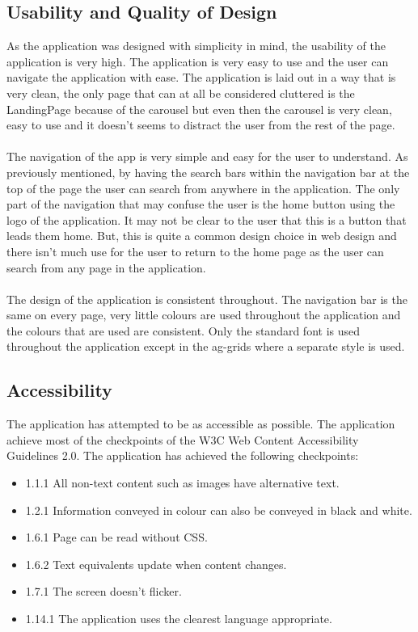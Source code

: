 \documentclass[12pt,a4paper]{article}
\begin{document}
		\subsection{Usability and Quality of Design}
			As the application was designed with simplicity in mind, the usability of the application is 
			very high. The application is very easy to use and the user can navigate the application with 
			ease. The application is laid out in a way that is very clean, the only page that can at all be 
			considered cluttered is the LandingPage because of the carousel but even then the carousel is 
			very clean, easy to use and it doesn't seems to distract the user from the rest of the page.\\
			\\
			The navigation of the app is very simple and easy for the user to understand. As previously mentioned, 
			by having the search bars within  the navigation bar at the top of the page the user can search from 
			anywhere in the application. The only part of the navigation that may confuse the user is the home button 
			using the logo of the application. It may not be clear to the user that this is a button that leads them 
			home. But, this is quite a common design choice in web design and there isn't much use for the user to return 
			to the home page as the user can search from any page in the application.\\
			\\
			The design of the application is consistent throughout. The navigation bar is the same on every page, 
			very little colours are used throughout the application and the colours that are used are consistent.
			Only the standard font is used throughout the application except in the ag-grids where a separate style 
			is used.\\
		
		\subsection{Accessibility}
			The application has attempted to be as accessible as possible. The application achieve most of the 
			checkpoints of the W3C Web Content Accessibility Guidelines 2.0. The application has achieved the 
			following checkpoints:
			\begin{itemize}
				\item 1.1.1 All non-text content such as images have alternative text.
				\item 1.2.1 Information conveyed in colour can also be conveyed in black and white. 
				\item 1.6.1 Page can be read without CSS.
				\item 1.6.2 Text equivalents update when content changes.
				\item 1.7.1 The screen doesn't flicker.
				\item 1.14.1 The application uses the clearest language appropriate.
			\end{itemize}
		
\end{document}
